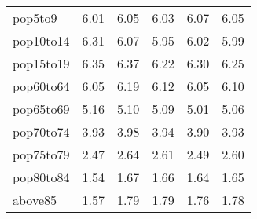 \begin{minipage}{7in}
\begin{tabular*}{\textwidth}{@{\extracolsep{\fill}}l*{5}{c}}
		pop5to9&6.01&6.05&6.03&6.07&6.05\\
		pop10to14&6.31&6.07&5.95&6.02&5.99\\
		pop15to19&6.35&6.37&6.22&6.30&6.25\\
		pop60to64&6.05&6.19&6.12&6.05&6.10\\
		pop65to69&5.16&5.10&5.09&5.01&5.06\\
		pop70to74&3.93&3.98&3.94&3.90&3.93\\
		pop75to79&2.47&2.64&2.61&2.49&2.60\\
		pop80to84&1.54&1.67&1.66&1.64&1.65\\
		above85&1.57&1.79&1.79&1.76&1.78\\
		
	\hline\hline
	\end{tabular*}
\end{minipage}
